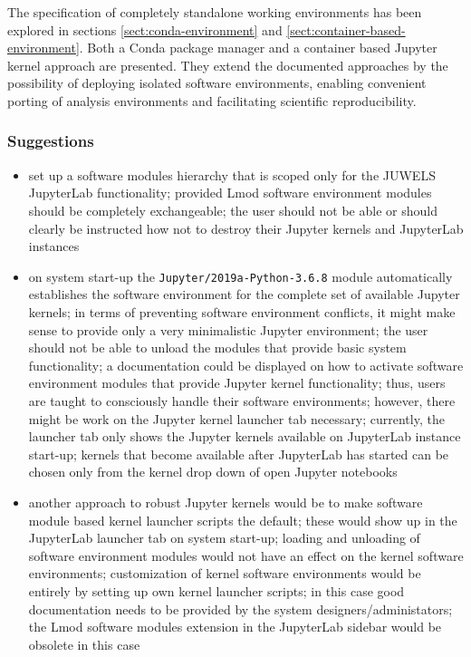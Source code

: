 \documentclass[11pt,a4paper]{article}
\begin{document}
The specification of completely standalone working environments has been explored in sections \ref{sect:conda-environment} and \ref{sect:container-based-environment}.
Both a Conda package manager and a container based Jupyter kernel approach are presented.
They extend the documented approaches by the possibility of deploying isolated software environments, enabling convenient porting of analysis environments and facilitating scientific reproducibility.

\subsubsection{Suggestions}

\begin{itemize}

  \item set up a software modules hierarchy that is scoped only for the JUWELS JupyterLab functionality;
  provided Lmod software environment modules should be completely exchangeable;
  the user should not be able or should clearly be instructed how not to destroy their Jupyter kernels and JupyterLab instances

  \item on system start-up the \verb|Jupyter/2019a-Python-3.6.8| module automatically establishes the software environment for the complete set of available Jupyter kernels;
  in terms of preventing software environment conflicts, it might make sense to provide only a very minimalistic Jupyter environment;
  the user should not be able to unload the modules that provide basic system functionality;
  a documentation could be displayed on how to activate software environment modules that provide Jupyter kernel functionality;
  thus, users are taught to consciously handle their software environments;
  however, there might be work on the Jupyter kernel launcher tab necessary;
  currently, the launcher tab only shows the Jupyter kernels available on JupyterLab instance start-up;
  kernels that become available after JupyterLab has started can be chosen only from the kernel drop down of open Jupyter notebooks

  \item another approach to robust Jupyter kernels would be to make software module based kernel launcher scripts the default; these would show up in the JupyterLab launcher tab on system start-up; loading and unloading of software environment modules would not have an effect on the kernel software environments; customization of kernel software environments would be entirely by setting up own kernel launcher scripts; in this case good documentation needs to be provided by the system designers/administators; the Lmod software modules extension in the JupyterLab sidebar would be obsolete in this case


\end{itemize}
\end{document}
